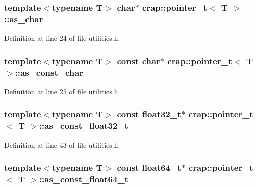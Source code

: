 \subsubsection[{as\+\_\+char}]{\setlength{\rightskip}{0pt plus 5cm}template$<$typename T$>$ char$\ast$ {\bf crap\+::pointer\+\_\+t}$<$ T $>$\+::as\+\_\+char}\label{structcrap_1_1pointer__t_adc5e76f4d3e2f3242b0e0c128e3a018e}


Definition at line 24 of file utilities.\+h.

\hypertarget{structcrap_1_1pointer__t_ad90d5ba7cd8c0996aaa5d6ac8e59197d}{}
\subsubsection[{as\+\_\+const\+\_\+char}]{\setlength{\rightskip}{0pt plus 5cm}template$<$typename T$>$ const char$\ast$ {\bf crap\+::pointer\+\_\+t}$<$ T $>$\+::as\+\_\+const\+\_\+char}\label{structcrap_1_1pointer__t_ad90d5ba7cd8c0996aaa5d6ac8e59197d}


Definition at line 25 of file utilities.\+h.

\hypertarget{structcrap_1_1pointer__t_afa325f26f6fb096a38c8215d5cfecdb4}{}
\subsubsection[{as\+\_\+const\+\_\+float32\+\_\+t}]{\setlength{\rightskip}{0pt plus 5cm}template$<$typename T$>$ const {\bf float32\+\_\+t}$\ast$ {\bf crap\+::pointer\+\_\+t}$<$ T $>$\+::as\+\_\+const\+\_\+float32\+\_\+t}\label{structcrap_1_1pointer__t_afa325f26f6fb096a38c8215d5cfecdb4}


Definition at line 43 of file utilities.\+h.

\hypertarget{structcrap_1_1pointer__t_a84605cb36a9a9fa5204122ca06ee126a}{}
\subsubsection[{as\+\_\+const\+\_\+float64\+\_\+t}]{\setlength{\rightskip}{0pt plus 5cm}template$<$typename T$>$ const {\bf float64\+\_\+t}$\ast$ {\bf crap\+::pointer\+\_\+t}$<$ T $>$\+::as\+\_\+const\+\_\+float64\+\_\+t}\label{structcrap_1_1pointer__t_a84605cb36a9a9fa5204122ca06ee126a}


